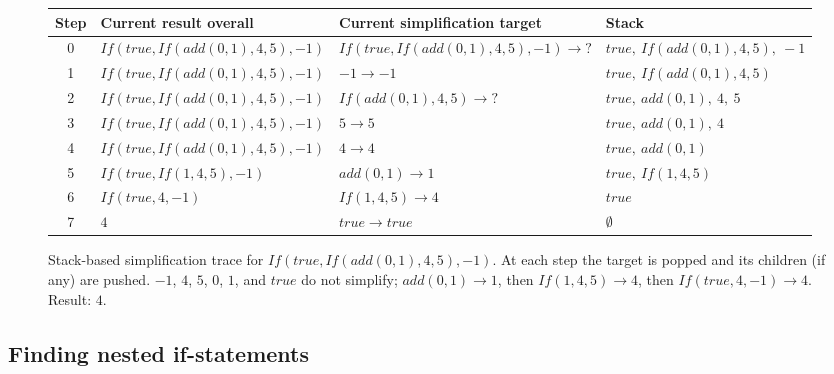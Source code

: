 \documentclass[11pt]{article}
\begin{document}
\begin{figure}[H]
    \centering
    \begin{tabular}{|c|l|l|l|}
        \hline
        \textbf{Step} & \textbf{Current result overall} & \textbf{Current simplification target} & \textbf{Stack} \\
        \hline
        0 & $\mathit{If}(\mathit{true}, \mathit{If}(\mathit{add}(0,1), 4, 5), -1)$ & $\mathit{If}(\mathit{true}, \mathit{If}(\mathit{add}(0,1), 4, 5), -1) \to ?$ & $\mathit{true},\ \mathit{If}(\mathit{add}(0,1), 4, 5),\ -1$ \\
        \hline
        1 & $\mathit{If}(\mathit{true}, \mathit{If}(\mathit{add}(0,1), 4, 5), -1)$ & $-1 \to -1$ & $\mathit{true},\ \mathit{If}(\mathit{add}(0,1), 4, 5)$ \\
        \hline
        2 & $\mathit{If}(\mathit{true}, \mathit{If}(\mathit{add}(0,1), 4, 5), -1)$ & $\mathit{If}(\mathit{add}(0,1), 4, 5) \to ?$ & $\mathit{true},\ \mathit{add}(0,1),\ 4,\ 5$ \\
        \hline
        3 & $\mathit{If}(\mathit{true}, \mathit{If}(\mathit{add}(0,1), 4, 5), -1)$ & $5 \to 5$ & $\mathit{true},\ \mathit{add}(0,1),\ 4$ \\
        \hline
        4 & $\mathit{If}(\mathit{true}, \mathit{If}(\mathit{add}(0,1), 4, 5), -1)$ & $4 \to 4$ & $\mathit{true},\ \mathit{add}(0,1)$ \\
        \hline
        5 & $\mathit{If}(\mathit{true}, \mathit{If}(1, 4, 5), -1)$ & $\mathit{add}(0, 1) \to 1$ & $\mathit{true},\ \mathit{If}(1, 4, 5)$ \\
        \hline
        6 & $\mathit{If}(\mathit{true}, 4, -1)$ & $\mathit{If}(1, 4, 5) \to 4$ & $\mathit{true}$ \\
        \hline
        7 & $4$ & $\mathit{true} \to \mathit{true}$ & $\emptyset$ \\
        \hline
    \end{tabular}
    \caption{Stack-based simplification trace for $\mathit{If}(\mathit{true}, \mathit{If}(\mathit{add}(0,1), 4, 5), -1)$. At each step the target is popped and its children (if any) are pushed. $-1$, $4$, $5$, $0$, $1$, and $\mathit{true}$ do not simplify; $\mathit{add}(0,1) \to 1$, then $\mathit{If}(1, 4, 5) \to 4$, then $\mathit{If}(\mathit{true}, 4, -1) \to 4$. Result: $4$.}
    \label{fig:btor-simplify}
\end{figure}

\subsection{Finding nested if-statements}
\end{document}
